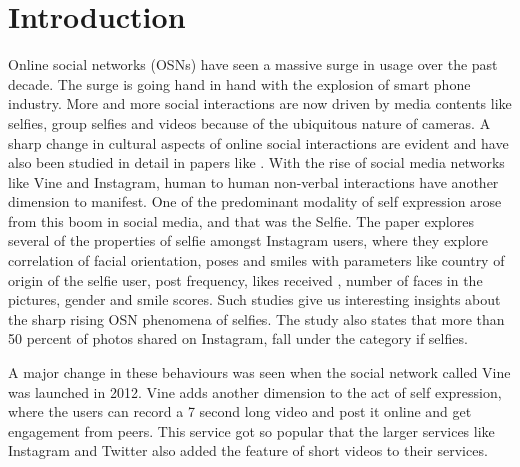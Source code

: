 \section{Introduction}
Online social networks (OSNs) have seen a massive surge in usage over the past decade. The surge is going hand in hand with the explosion of smart phone industry. More and more social interactions are now driven by media contents like selfies, group selfies and videos because of the ubiquitous nature of cameras. A sharp change in cultural aspects of online social interactions are evident and have also been studied in detail in papers like \cite{Souza2015}. 
With the rise of social media networks like Vine and Instagram, human to human non-verbal interactions have another dimension to manifest. One of the predominant modality of self expression arose from this boom in social media, and that was the Selfie. The \cite{Souza2015} paper explores several of the properties of selfie amongst Instagram users, where they explore correlation of facial orientation, poses and smiles with parameters like country of origin of the selfie user, post frequency, likes received , number of faces in the pictures, gender and smile scores. Such studies give us interesting insights about the sharp rising OSN phenomena of selfies. The study also states that more than 50 percent of photos shared on Instagram, fall under the category if selfies. 
\par
A major change in these behaviours was seen when the social network called Vine was launched in 2012. Vine adds another dimension to the act of self expression, where the users can record a 7 second long video and post it online and get engagement from peers. This service got so popular that the larger services like Instagram and Twitter also added the feature of short videos to their services. 

